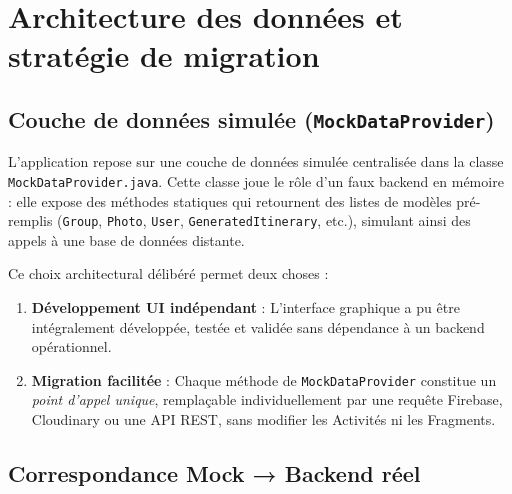\documentclass{article}
\begin{document}
\section*{Architecture des données et stratégie de migration}

\subsection*{Couche de données simulée (\texttt{MockDataProvider})}

L'application repose sur une couche de données simulée centralisée dans la classe \texttt{MockDataProvider.java}. Cette classe joue le rôle d'un faux backend en mémoire : elle expose des méthodes statiques qui retournent des listes de modèles pré-remplis (\texttt{Group}, \texttt{Photo}, \texttt{User}, \texttt{GeneratedItinerary}, etc.), simulant ainsi des appels à une base de données distante.

Ce choix architectural délibéré permet deux choses :
\begin{enumerate}
    \item \textbf{Développement UI indépendant} : L'interface graphique a pu être intégralement développée, testée et validée sans dépendance à un backend opérationnel.
    \item \textbf{Migration facilitée} : Chaque méthode de \texttt{MockDataProvider} constitue un \textit{point d'appel unique}, remplaçable individuellement par une requête Firebase, Cloudinary ou une API REST, sans modifier les Activités ni les Fragments.
\end{enumerate}

\subsection*{Correspondance Mock → Backend réel}
\end{document}
